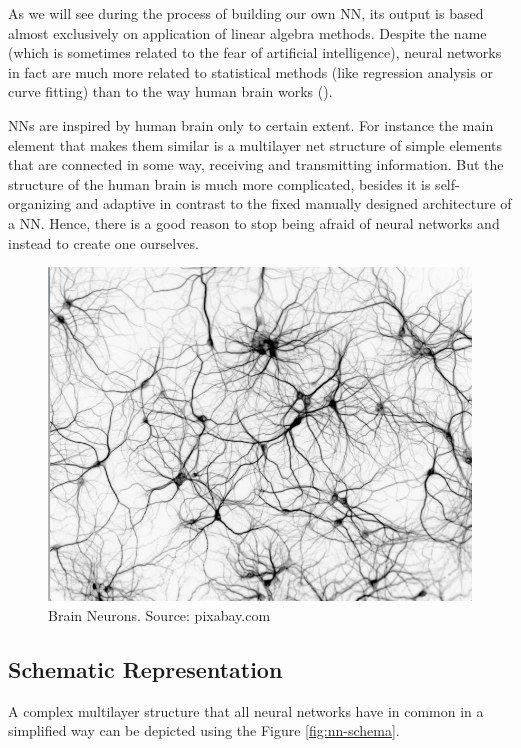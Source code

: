As we will see during the process of building our own NN, its output is based almost exclusively on application of linear algebra methods. Despite the name (which is sometimes related to the fear of artificial intelligence), neural networks in fact are much more related to statistical methods (like regression analysis or curve fitting) than to the way human brain works (\cite{reid2014}). 

NNs are inspired by human brain only to certain extent. For instance the main element that makes them similar is a multilayer net structure of simple elements that are connected in some way, receiving and transmitting information. But the structure of the human brain is much more complicated, besides it is self-organizing and adaptive in contrast to the fixed manually designed architecture of a NN. Hence, there is a good reason to stop being afraid of neural networks and instead to create one ourselves.

\begin{figure}[H]
    \includegraphics[width=\linewidth]{pics/neurons_net3.png}
    \caption{\label{fig:real-neurons} Brain Neurons. Source: pixabay.com}
\end{figure}


\subsection{Schematic Representation}
A complex multilayer structure that all neural networks have in common in a simplified way can be depicted using the Figure \ref{fig:nn-schema}.

